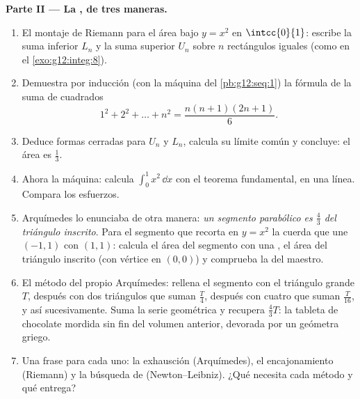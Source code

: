 \begin{problem}
\medskip
\noindent\textbf{Parte II --- La , de tres maneras.}
\begin{enumerate}[resume]
  \item El montaje de Riemann para el área bajo $y = x^2$ en
        $\intcc{0}{1}$: escribe la suma inferior $L_n$ y la suma superior
        $U_n$ sobre $n$ rectángulos iguales (como en el
        \cref{exo:g12:integ:8}).
  \item Demuestra por inducción (con la máquina del \cref{pb:g12:seq:1}) la
        fórmula de la suma de cuadrados
        \[
        1^2 + 2^2 + \dots + n^2 = \frac{n(n+1)(2n+1)}{6} .
        \]
  \item Deduce formas cerradas para $U_n$ y $L_n$, calcula su límite común
        y concluye: el área es $\frac13$.
  \item Ahora la máquina: calcula $\int_0^1 x^2\,\dd x$ con el teorema
        fundamental, en una línea. Compara los esfuerzos.
  \item Arquímedes lo enunciaba de otra manera: \emph{un segmento
        parabólico es $\frac43$ del triángulo inscrito}. Para el segmento
        que recorta en $y = x^2$ la cuerda que une $(-1, 1)$ con $(1, 1)$:
        calcula el área del segmento con una , el área del
        triángulo inscrito (con vértice en $(0, 0)$) y comprueba la 
        del maestro.
  \item El método del propio Arquímedes: rellena el segmento con el
        triángulo grande $T$, después con dos triángulos que suman
        $\frac T4$, después con cuatro que suman $\frac{T}{16}$, y así
        sucesivamente. Suma la serie geométrica y recupera $\frac43 T$: la
        tableta de chocolate mordida sin fin del volumen anterior,
        devorada por un geómetra griego.
  \item Una frase para cada uno: la exhausción (Arquímedes), el
        encajonamiento (Riemann) y la búsqueda de 
        (Newton--Leibniz). ¿Qué necesita cada método y qué entrega?
\end{enumerate}


\end{problem}
